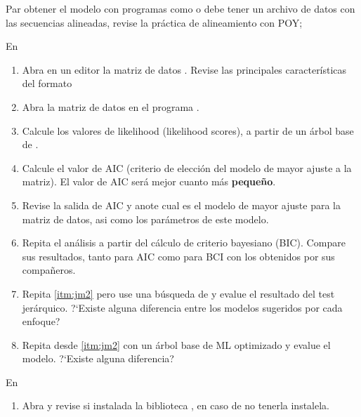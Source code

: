 {Par obtener el modelo con programas como  o  debe tener un archivo de datos con las secuencias alineadas, revise la pr\'actica de alineamiento con POY; %


En 


\begin{enumerate}
	\item Abra en un editor la matriz de datos . Revise las principales caracter\'isticas del formato 

	\item Abra la matriz de datos en el programa .
	
	\item\label{itm:jm2} Calcule los valores de likelihood (likelihood scores), a partir de un \'arbol base de . 
	
	\item Calcule el valor de AIC (criterio de elecci\'on del modelo de mayor ajuste a la matriz). El valor de AIC ser\'a mejor cuanto m\'as \textbf{peque\~no}.
	
	\item Revise la salida de AIC y anote cual es el modelo de mayor ajuste para la matriz de datos, asi como los par\'ametros de este modelo.
	
	\item Repita el an\'alisis a partir del c\'alculo de criterio bayesiano (BIC). Compare sus resultados, tanto para AIC como para BCI con los obtenidos por sus compa\~neros.

	\item Repita \ref{itm:jm2}  pero use una b\'usqueda de  y evalue el resultado del test jer\'arquico. ?`Existe alguna diferencia entre los modelos sugeridos por cada enfoque? 

	\item Repita desde \ref{itm:jm2} con un \'arbol base de ML optimizado y evalue el modelo. ?`Existe alguna diferencia?
\end{enumerate}



En 


\begin{enumerate}
	
	\item Abra  y revise si instalada la biblioteca , en caso de no tenerla instalela.
	

\end{enumerate}}
